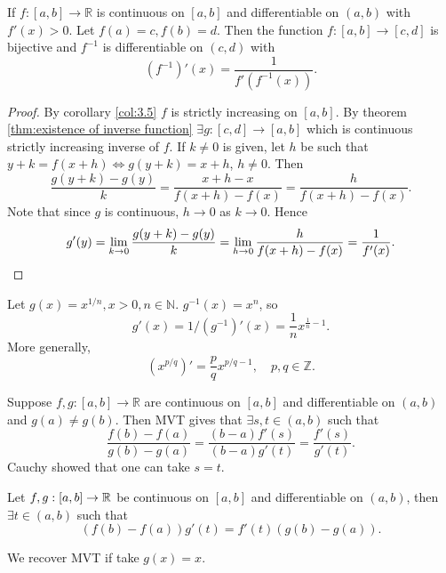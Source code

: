 \begin{theorem}\label{thm:Inverse function theorem}
    If $ f:[a,b]\to \mathbb{R}  $ is continuous on $[a,b]$ and differentiable on $ (a,b) $ with $ f'(x)>0 $. Let $f(a)=c,f(b)=d$. Then the function $ f:[a,b]\to [c,d] $ is bijective and $ f^{-1} $ is differentiable on $(c,d)$ with 
    \[
        (f^{-1})'(x)=\frac{1}{f'(f^{-1}(x))}.
    \]
\end{theorem}
\begin{proof}
    By corollary \ref{col:3.5} $f$ is strictly increasing on $[a,b]$. By theorem \ref{thm:existence of inverse function} $ \exists g:[c,d]\to [a,b] $ which is continuous strictly increasing inverse of $f$. If $k\neq 0$ is given, let $ h $ be such that $ y+k = f(x+h) \Leftrightarrow g(y+k)=x+h $, $ h\neq 0 $. Then 
    \[
        \frac{g(y+k)-g(y)}{k} = \frac{x+h-x}{f(x+h)-f(x)}= \frac{h}{f(x+h)-f(x)}.
    \]
    Note that since $g$ is continuous, $ h\to 0 $ as $ k\to 0 $. Hence
    \[
        g'(y) = \lim_{k \to 0} \frac{g(y+k)-g(y)}{k} = \lim_{h \to 0} \frac{h}{f(x+h)-f(x)} = \frac{1}{f'(x)}.\qedhere
    \]
\end{proof}
\begin{example}
    Let $ g(x)=x^{1/n},x>0,n\in \mathbb{N} $. $ g^{-1}(x)=x^{n} $, so
    \[
        g'(x) = 1/(g^{-1})'(x)=\frac{1}{n}x^{\frac{1}{n}-1}.
    \]
    More generally,
    \[
        \left( x^{p/q} \right)'=\frac{p}{q}x^{p/q-1},\quad p,q\in \mathbb{Z}.
    \]
\end{example}

Suppose $ f,g: [a,b] \to \mathbb{R} $ are continuous on $[a,b]$ and differentiable on $(a,b)$ and $g(a)\neq g(b)$. Then MVT gives that $ \exists s,t\in (a,b) $ such that 
\[
    \frac{f(b)-f(a)}{g(b)-g(a)}=\frac{(b-a)f'(s)}{(b-a)g'(t)}=\frac{f'(s)}{g'(t)}.
\]
Cauchy showed that one can take $s=t$.
\begin{theorem}\label{thm:Cauchy}
    Let $f,g:[a,b]\to {\mathbb{R}}$ be continuous on $[a,b]$ and differentiable on $(a,b)$, then $ \exists t\in (a,b) $ such that 
    \[
        (f(b)-f(a))g'(t)=f'(t)(g(b)-g(a)).
    \]
\end{theorem}
\begin{note}
    We recover MVT if take $g(x)=x$.
\end{note}